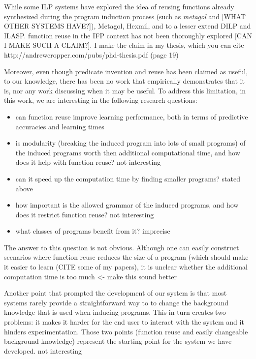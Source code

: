 While some ILP systems have explored the idea of reusing functions already synthesized during the program induction process (such as \textit{metagol} and [WHAT OTHER SYSTEMS HAVE?]),
\ac{Metagol, Hexmil, and to a lesser extend DILP and ILASP}.
function reuse in the IFP context has not been thoroughly explored [CAN I MAKE SUCH A CLAIM?]. \ac{I make the claim in my thesis, which you can cite http://andrewcropper.com/pubs/phd-thesis.pdf (page 19)}

\ac{
Moreover, even though predicate invention and reuse has been claimed as useful, to our knowledge, there has been no work that empirically demonstrates that it is, nor any work discussing when it may be useful.
To address this limitation, in this work, we are interesting in the following research questions:
}

\begin{itemize}
\item \ac{can function reuse improve learning performance, both in terms of predictive accuracies and learning times}
\item is modularity (breaking the induced program into lots of small programs) of the induced programs worth then additional computational time, and how does it help with function reuse? \ac{not interesting}
\item can it speed up the computation time by finding smaller programs? \ac{stated above}
\item how important is the allowed grammar of the induced programs, and how does it restrict function reuse? \ac{not interesting}
\item what classes of programs benefit from it? \ac{imprecise}
\end{itemize}

\ac{
The answer to this question is not obvious.
Although one can easily construct scenarios where function reuse reduces the size of a program (which should make it easier to learn (CITE some of my papers), it is unclear whether the additional computation time is too much <- make this sound better}

\indent \indent Another point that prompted the development of our system is that most systems rarely provide a straightforward way to to change the background knowledge that is used when inducing programs.  This in turn creates two problems: it makes it harder for the end user to interact with the system and it hinders experimentation. Those two points (function reuse and easily changeable background knowledge) represent the starting point for the system we have developed. \ac{not interesting}

